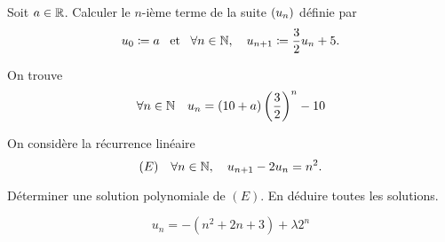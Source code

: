 \documentclass{magnolia}
\begin{document}
\begin{exos}
  \exo Soit $a\in\mathbb{R}$. Calculer le $n$-ième terme de la suite $\left(u_n\right)$
    définie par
    \[u_0\coloneqq a \quad\!\text{et}\quad\! \forall n\in\mathbb{N} ,\quad u_{n+1}\coloneqq\frac{3}{2}u_n+5.\]
    \begin{sol}
    On trouve
    \[\forall n\in\mathbb{N} \quad u_n=\left(10+a\right)\left(\frac{3}{2}\right)^n-10\]
    \end{sol}
  \exo On considère la récurrence linéaire
    \[(E) \quad \forall n\in\mathbb{N},\quad u_{n+1}-2u_n=n^2.\]
    \begin{questions}
    \question Déterminer une solution polynomiale de $(E)$.
    \question En déduire toutes les solutions.
    \end{questions}
    \begin{sol}
  \[u_n=-(n^2+2n+3)+\lambda 2^n\]
    \end{sol}
  \end{exos}

\end{document}
